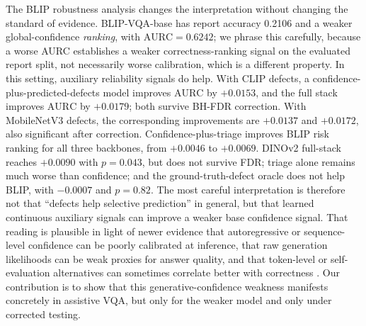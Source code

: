 \documentclass{ieeeaccess}
\newcommand{\aurc}{\mathrm{AURC}}
\newcommand{\clip}{CLIP}
\newcommand{\dinov}{DINOv2}
\newcommand{\mobilenet}{MobileNetV3}
\newcommand{\blip}{BLIP}
\begin{document}
The \blip{} robustness analysis changes the interpretation without changing the standard of evidence. \blip{}-VQA-base has report accuracy 0.2106 and a weaker global-confidence \emph{ranking}, with $\aurc=0.6242$; we phrase this carefully, because a worse AURC establishes a weaker correctness-ranking signal on the evaluated report split, not necessarily worse calibration, which is a different property. In this setting, auxiliary reliability signals do help. With \clip{} defects, a confidence-plus-predicted-defects model improves $\aurc$ by $+0.0153$, and the full stack improves $\aurc$ by $+0.0179$; both survive BH-FDR correction. With \mobilenet{} defects, the corresponding improvements are $+0.0137$ and $+0.0172$, also significant after correction. Confidence-plus-triage improves \blip{} risk ranking for all three backbones, from $+0.0046$ to $+0.0069$. \dinov{} full-stack reaches $+0.0090$ with $p=0.043$, but does not survive FDR; triage alone remains much worse than confidence; and the ground-truth-defect oracle does not help \blip{}, with $-0.0007$ and $p=0.82$. The most careful interpretation is therefore not that ``defects help selective prediction'' in general, but that learned continuous auxiliary signals can improve a weaker base confidence signal. That reading is plausible in light of newer evidence that autoregressive or sequence-level confidence can be poorly calibrated at inference, that raw generation likelihoods can be weak proxies for answer quality, and that token-level or self-evaluation alternatives can sometimes correlate better with correctness \cite{wang2020inferencecalibration,ren2023selfevaluation,wang2024myanswerisc,groot2024overconfidence}. Our contribution is to show that this generative-confidence weakness manifests concretely in assistive VQA, but only for the weaker model and only under corrected testing.
\end{document}
